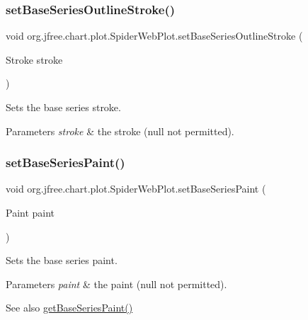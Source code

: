 \subsubsection{\texorpdfstring{set\+Base\+Series\+Outline\+Stroke()}{setBaseSeriesOutlineStroke()}}
{\footnotesize\ttfamily void org.\+jfree.\+chart.\+plot.\+Spider\+Web\+Plot.\+set\+Base\+Series\+Outline\+Stroke (\begin{DoxyParamCaption}\item[{Stroke}]{stroke }\end{DoxyParamCaption})}

Sets the base series stroke.


\begin{DoxyParams}{Parameters}
{\em stroke} & the stroke ({\ttfamily null} not permitted). \\
\hline
\end{DoxyParams}
\mbox{\label{classorg_1_1jfree_1_1chart_1_1plot_1_1_spider_web_plot_ab62b188899ac692b78f78765ad0d0e1b}} 
\subsubsection{\texorpdfstring{set\+Base\+Series\+Paint()}{setBaseSeriesPaint()}}
{\footnotesize\ttfamily void org.\+jfree.\+chart.\+plot.\+Spider\+Web\+Plot.\+set\+Base\+Series\+Paint (\begin{DoxyParamCaption}\item[{Paint}]{paint }\end{DoxyParamCaption})}

Sets the base series paint.


\begin{DoxyParams}{Parameters}
{\em paint} & the paint ({\ttfamily null} not permitted).\\
\hline
\end{DoxyParams}
\begin{DoxySeeAlso}{See also}
\mbox{\hyperlink{classorg_1_1jfree_1_1chart_1_1plot_1_1_spider_web_plot_ad894e0dd3eaa6a2d887f6d18f724cc30}{get\+Base\+Series\+Paint()}} 
\end{DoxySeeAlso}
\mbox{\label{classorg_1_1jfree_1_1chart_1_1plot_1_1_spider_web_plot_a44453e46effe569cfbfd96c3a0667a3d}} 
